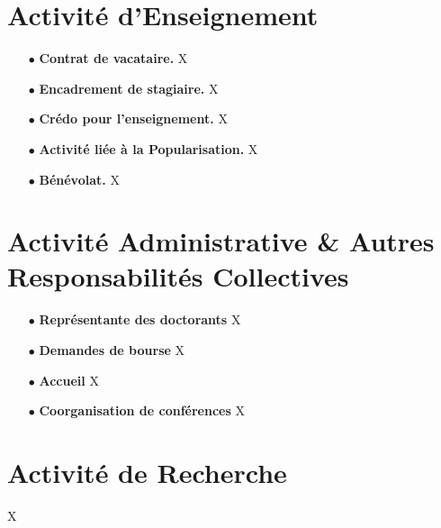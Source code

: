 \documentclass[a4paper, 12pt, twoside, openright]{article}
\begin{document}
\section{Activité d'Enseignement}\label{ens}
\begin{itemize}
\item[\color{MagSombre}$\bullet$] \textbf{\color{MagSombre}Contrat de vacataire.} X
\item[\color{MagSombre}$\bullet$] \textbf{\color{MagSombre}Encadrement de stagiaire.} X 
\item[\color{MagSombre}$\bullet$] \textbf{\color{MagSombre}Crédo pour l'enseignement.} X
\item[\color{MagSombre}$\bullet$] \textbf{\color{MagSombre}Activité liée à la Popularisation.} X
\item[\color{MagSombre}$\bullet$] \textbf{\color{MagSombre}Bénévolat.} X
\end{itemize}

\section{Activité Administrative \& Autres Responsabilités Collectives}
\begin{itemize}
\item[\color{MagSombre}$\bullet$] \textbf{\color{MagSombre}Représentante des doctorants} X
\item[\color{MagSombre}$\bullet$] \textbf{\color{MagSombre}Demandes de bourse} X
\item[\color{MagSombre}$\bullet$] \textbf{\color{MagSombre}Accueil} X
\item[\color{MagSombre}$\bullet$] \textbf{\color{MagSombre}Coorganisation de conférences} X
\end{itemize}

\section{Activité de Recherche}\label{AR}
X
\end{document}
